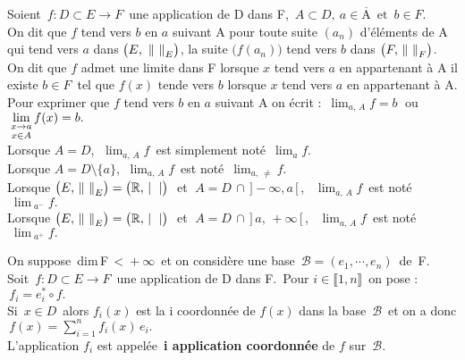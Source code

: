 Soient \(\,f:D\subset E\to F\,\) une application de D dans F, \(\,A\subset D,\ a\in \overline{\text{A}}\,\text{ et } \,b\in F.\)\vspace{0.1cm}\\
On dit que $f$ tend vers $b$ en $a$ suivant A \ssi pour toute suite $(a_n)$ d'éléments de A qui tend vers $a$ dans \(\bigl(E,\ \left\lVert\ \right\rVert_E\bigr)\), la suite \(\bigl(f(a_n)\bigr)\) tend vers $b$ dans \(\bigl(F,\, \norm{\ }_F\bigr)\).\vspace{0.2cm}\\
On dit que $f$ admet une limite dans F lorsque $x$ tend vers $a$ en appartenant à A \ssi il existe $b\in F\,$ tel que $f(x)$ tende vers $b$ lorsque $x$ tend vers $a$ en appartenant à A.\vspace{0.2cm}\\
Pour exprimer que $f$ tend vers $b$ en $a$ suivant A on écrit : \(\,\displaystyle \lim_{a,\,A}f=b\;\) ou \( \;\displaystyle \lim_{\substack{\vspace{-0.05cm} \\ x\to a\vspace{0.05cm}\\ x\in A}} f(x)=b.\)\vspace{-0.1cm}\\
Lorsque $A=D$, \(\displaystyle \; \lim_{a,\,A}f\,\) est simplement noté \(\,\displaystyle \lim_af.\)\vspace{0.15cm}\\
Lorsque $A=D\!\setminus\!\{a\}$, \(\ \displaystyle \lim_{a,\,A}f\,\) est noté \(\,\displaystyle \lim_{a,\, \neq}f.\)\vspace{0.15cm}\\
Lorsque \(\bigl(E,\, \norm{\ }_E\bigr)=\bigl(\RR,\, \mid\ \; \mid\bigr)\;\) et \(\;A=D\,\cap\,]-\!\infty,a\,[\,\), \(\ \displaystyle \; \lim_{a,\,A}f\,\) est noté \(\;\displaystyle \lim_{\;a^-}f.\)\vspace{0.15cm}\\
Lorsque \(\bigl(E,\, \norm{\ }_E\bigr)=\bigl(\RR,\, \mid\ \; \mid\bigr)\;\) et \(\;A=D\,\cap\,]\,a,\,+\infty\,[\,\), \(\ \displaystyle \; \lim_{a,\,A}f\,\) est noté \(\;\displaystyle \lim_{\;a^+}f.\)

\vspace{1.5cm}

On suppose\, dim\,F\(\,<\!+\infty\,\) et on considère une base \(\,\mathcal{B}=(e_1,\cdots,e_n)\,\) de\, F.\vspace{0.1cm}\\
Soit \(\,f:D\subset E\to F\,\) une application de D dans F. \,Pour \(i\in \llbracket 1,n \rrbracket\,\) on pose : \(\,f_i=e_i^*\circ f.\)\vspace{0.1cm}\\
Si \(\,x\in D\,\) alors $f_i(x)$ est la i coordonnée de $f(x)$ dans la base $\,\mathcal{B}\,$ et on a donc \(\,\displaystyle f(x)=\sum_{i=1}^{n}f_i(x)\,e_i.\)\vspace{(-0.2cm)}\\
L'application $f_i$ est appelée\, \textbf{i application coordonnée} de $f$ sur $\,\mathcal{B}.$

